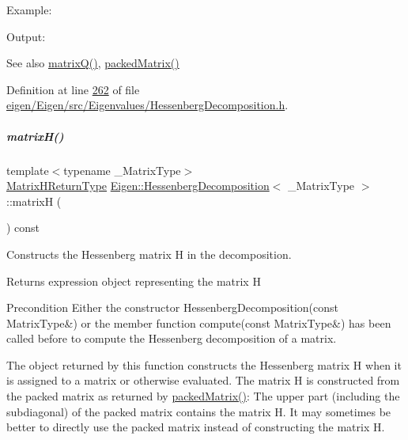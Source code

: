 Example\+: 
\begin{DoxyCodeInclude}
\end{DoxyCodeInclude}
 Output\+: 
\begin{DoxyVerbInclude}
\end{DoxyVerbInclude}


\begin{DoxySeeAlso}{See also}
\hyperlink{group___eigenvalues___module_a346441e4902a58d43d698ac3da6ff791}{matrix\+Q()}, \hyperlink{group___eigenvalues___module_a1f72b7612fd4edc5a6f31005e433e1dd}{packed\+Matrix()} 
\end{DoxySeeAlso}


Definition at line \hyperlink{eigen_2_eigen_2src_2_eigenvalues_2_hessenberg_decomposition_8h_source_l00262}{262} of file \hyperlink{eigen_2_eigen_2src_2_eigenvalues_2_hessenberg_decomposition_8h_source}{eigen/\+Eigen/src/\+Eigenvalues/\+Hessenberg\+Decomposition.\+h}.

\mbox{\label{group___eigenvalues___module_a8e781d2e22a2304647bcf0ae913cc8ea}} 
\subparagraph{\texorpdfstring{matrix\+H()}{matrixH()}\hspace{0.1cm}{\footnotesize\ttfamily [2/2]}}
{\footnotesize\ttfamily template$<$typename \+\_\+\+Matrix\+Type$>$ \\
\hyperlink{group___eigenvalues___module_struct_eigen_1_1internal_1_1_hessenberg_decomposition_matrix_h_return_type}{Matrix\+H\+Return\+Type} \hyperlink{group___eigenvalues___module_class_eigen_1_1_hessenberg_decomposition}{Eigen\+::\+Hessenberg\+Decomposition}$<$ \+\_\+\+Matrix\+Type $>$\+::matrixH (\begin{DoxyParamCaption}{ }\end{DoxyParamCaption}) const\hspace{0.3cm}{\ttfamily [inline]}}



Constructs the Hessenberg matrix H in the decomposition. 

\begin{DoxyReturn}{Returns}
expression object representing the matrix H
\end{DoxyReturn}
\begin{DoxyPrecond}{Precondition}
Either the constructor Hessenberg\+Decomposition(const Matrix\+Type\&) or the member function compute(const Matrix\+Type\&) has been called before to compute the Hessenberg decomposition of a matrix.
\end{DoxyPrecond}
The object returned by this function constructs the Hessenberg matrix H when it is assigned to a matrix or otherwise evaluated. The matrix H is constructed from the packed matrix as returned by \hyperlink{group___eigenvalues___module_a1f72b7612fd4edc5a6f31005e433e1dd}{packed\+Matrix()}\+: The upper part (including the subdiagonal) of the packed matrix contains the matrix H. It may sometimes be better to directly use the packed matrix instead of constructing the matrix H.

